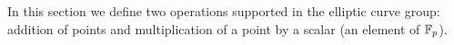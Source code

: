 In this section we define 
two operations supported in the elliptic curve group: addition of points and multiplication of a point by a scalar (an element of $\mathbb{F}_p$).
